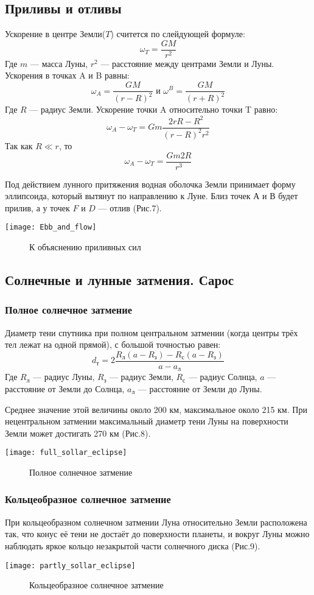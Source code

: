 \documentclass[10pt,a5paper]{article}
\begin{document}
\subsection*{Приливы и отливы}
Ускорение в центре Земли($T$) считется по слейдующей формуле: $$\omega_T=\frac{GM}{r^2}$$
Где $m$ --- масса Луны, $r^2$ --- расстояние между центрами Земли и Луны. Ускорения в точках A и B равны:
$$\omega_A=\frac{GM}{(r-R)^2} \text{ и } \omega^B=\frac{GM}{(r+R)^2}$$
Где $R$ --- радиус Земли. Ускорение точки A относительно точки T равно:
$$\omega_A-\omega_T=Gm\frac{2rR-R^2}{(r-R)^2r^2}$$
Так как $R\ll r$, то $$\omega_A-\omega_T=\frac{Gm2R}{r^3}$$

Под действием лунного притяжения водная оболочка Земли принимает форму эллипсоида, который вытянут по направлению к Луне. Близ точек $А$ и $В$ будет прилив, а у точек $F$ и $D$ --- отлив (Рис.7).
\begin{center}
\texttt{[image: Ebb\_and\_flow]}
\begin{figure}[h!]
\caption{К объяснению приливных сил}
\end{figure}
\end{center}
\subsection*{Солнечные и лунные затмения. Сарос}
\subsubsection*{Полное солнечное затмение}
Диаметр тени спутника при полном центральном затмении (когда центры трёх тел лежат на одной прямой), с большой точностью равен:
$$d_\text{т}=2\frac{R_\text{л}(a-R_\text{з})-R_\text{с}(a-R_\text{з})}{a-a_\text{л}}$$
Где $R_\text{л}$ --- радиус Луны, $R_\text{з}$ --- радиус Земли, $R_\text{с}$ --- радиус Солнца, $a$ --- расстояние от Земли до Солнца, $a_\text{л}$ --- расстояние от Земли до Луны.

Среднее значение  этой величины около 200 км, максимальное около 215 км. При нецентральном затмении максимальный диаметр тени Луны на поверхности Земли может достигать 270 км (Рис.8).
\begin{center}
\texttt{[image: full\_sollar\_eclipse]}
\begin{figure}[h!]
\caption{Полное солнечное затмение}
\end{figure}
\end{center}
\subsubsection*{Кольцеобразное солнечное затмение}
При кольцеобразном солнечном затмении Луна относительно Земли расположена так, что конус её тени не достаёт до поверхности планеты, и вокруг Луны можно наблюдать яркое кольцо незакрытой части солнечного диска (Рис.9).
\begin{center}
\texttt{[image: partly\_sollar\_eclipse]}
\begin{figure}[h!]
\caption{Кольцеобразное солнечное затмение}
\end{figure}
\end{center}
\end{document}
